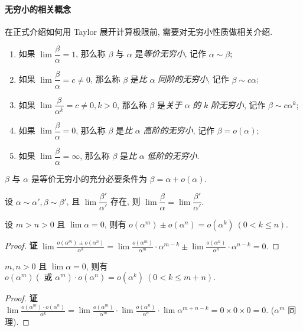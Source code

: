 \paragraph{无穷小的相关概念}
在正式介绍如何用 Taylor 展开计算极限前, 需要对无穷小性质做相关介绍.
\begin{definition}[无穷小的相关定义]
    \begin{enumerate}[label=(\arabic{*})]
        \item 如果 $\lim\dfrac{\beta}{\alpha}=1$, 那么称 $\beta$ 与 $\alpha$ 是\textit{等价无穷小}, 记作 $\alpha\sim\beta$;
        \item 如果 $\lim\dfrac{\beta}{\alpha}=c\neq0$, 那么称 $\beta$ 是\textit{比} $\alpha$ \textit{同阶的无穷小}, 记作 $\beta\sim c\alpha$;
        \item 如果 $\lim\dfrac{\beta}{\alpha^k}=c\neq0,k>0$, 那么称 $\beta$ 是\textit{关于} $\alpha$ \textit{的} $k$ \textit{阶无穷小}, 记作 $\beta\sim c\alpha^k$;
        \item 如果 $\lim\dfrac{\beta}{\alpha}=0$, 那么称 $\beta$ 是\textit{比} $\alpha$ \textit{高阶的无穷小}, 记作 $\beta=o(\alpha)$;
        \item 如果 $\lim\dfrac{\beta}{\alpha}=\infty$, 那么称 $\beta$ 是\textit{比} $\alpha$ \textit{低阶的无穷小}.
    \end{enumerate}
    \label{infinitesimalDefinitions}
\end{definition}

\begin{theorem}[等价无穷小的充要条件]
    $\beta$ 与 $\alpha$ 是等价无穷小的充分必要条件为 $\beta=\alpha+o(\alpha).$
\end{theorem}
\begin{theorem}[无穷小量的传递性]
    设 $\alpha\sim\alpha',\beta\sim\beta'$, 且 $\lim\dfrac{\beta'}{\alpha'}$ 存在, 则 $\lim\dfrac{\beta}{\alpha}=\lim\dfrac{\beta'}{\alpha'}.$
\end{theorem}
\begin{theorem}[无穷小量的加法]
    设 $m>n>0$ 且 $\lim\alpha=0$, 则有 $o(\alpha^m)\pm o(\alpha^n)=o(\alpha^k)~ (0<k\leqslant n).$
\end{theorem}
\begin{proof}{\songti \textbf{证}}
    $\displaystyle\lim \frac{o\left(\alpha^{m}\right) \pm o\left(\alpha^{n}\right)}{\alpha^{k}}=\lim \frac{o\left(\alpha^{m}\right)}{\alpha^{m}} \cdot \alpha^{m-k} \pm \lim \frac{o\left(\alpha^{n}\right)}{\alpha^{n}} \cdot \alpha^{n-k}=0.$
\end{proof}
\begin{theorem}[无穷小量的乘法]
    $m,n>0$ 且 $\lim\alpha=0$, 则有 $o(\alpha^m)(\text{ 或 }\alpha^m)\cdot o(\alpha^n)=o(\alpha^k)~ (0<k\leqslant m+n).$
\end{theorem}
\begin{proof}{\songti \textbf{证}}
    $\displaystyle\lim \frac{o\left(\alpha^{m}\right) \cdot o\left(\alpha^{n}\right)}{\alpha^{k}}=\lim \frac{o\left(\alpha^{m}\right)}{\alpha^{m}} \cdot \lim \frac{o\left(\alpha^{n}\right)}{\alpha^{n}} \cdot \lim \alpha^{m+n-k}=0 \times 0 \times 0=0.$ ($\alpha^m$ 同理).
\end{proof}

